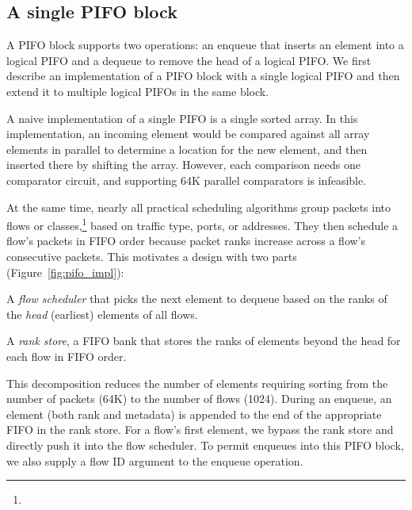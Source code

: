 \subsection{A single PIFO block}
\label{ss:single_block}

A PIFO block supports two operations: an enqueue that inserts an
element into a logical PIFO and a dequeue to remove the head of a
logical PIFO.  We first describe an implementation of a PIFO block with a
single logical PIFO and then extend it to multiple logical PIFOs in the same
block.

A naive implementation of a single PIFO is a single sorted array. In this
implementation, an incoming element would be compared against all array elements
in parallel to determine a location for the new element, and then inserted
there by shifting the array.  However, each comparison needs one comparator
circuit, and supporting 64K parallel comparators is infeasible.

At the same time, nearly all practical scheduling algorithms group packets into
flows or classes,\footnote{} \eg based on
traffic type, ports, or addresses. They then schedule a flow's packets in FIFO
order because packet ranks increase across a flow's consecutive packets.  This
motivates a design with two parts (Figure~\ref{fig:pifo_impl}):
\begin{CompactEnumerate}
\item A {\em flow scheduler} that picks the next element to dequeue based on
the ranks of the {\em head} (earliest) elements of all flows. 
\item A {\em rank store}, a FIFO bank that stores the ranks of elements beyond
the head for each flow in FIFO order.
\end{CompactEnumerate}

This decomposition reduces the number of elements requiring sorting from the
number of packets (64K) to the number of flows (1024). During an enqueue, an
element (both rank and metadata) is appended to the end of the appropriate FIFO
in the rank store. For a flow's first element, we bypass the rank store and
directly push it into the flow scheduler. To permit enqueues into this PIFO
block, we also supply a flow ID argument to the enqueue operation.

